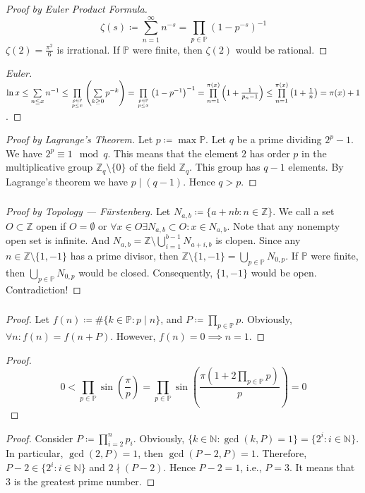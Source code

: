 \documentclass[UTF8,11pt,colorlinks,compress,openany]{beamer}%
\begin{document}
\begin{frame}\frametitle{}
\begin{proof}[Proof by Euler Product Formula]
\[\zeta(s)\coloneqq \sum\limits_{n=1}^\infty n^{-s}=\prod\limits_{p\in\mathbb{P}}\left(1-p^{-s}\right)^{-1}\]
$\zeta(2)=\frac{\pi^2}{6}$ is irrational. If $\mathbb{P}$ were finite, then $\zeta(2)$ would be rational.
\end{proof}
\begin{proof}[Euler]
$\ln x\leq\sum\limits_{n\leq x} n^{-1}\leq \prod\limits_{p\in\mathbb{P}\atop{p\leq x}}\left(\sum\limits_{k\geq 0}p^{-k}\right)=\prod\limits_{p\in\mathbb{P}\atop{p\leq x}}\left(1-p^{-1}\right)^{-1}=\prod\limits_{n=1}^{\pi(x)}\left(1+\frac{1}{p_n-1}\right)\leq \prod\limits_{n=1}^{\pi(x)}\left(1+\frac{1}{n}\right)=\pi(x)+1$.
\end{proof}
\begin{proof}[Proof by Lagrange's Theorem]
Let $p\coloneqq \max\mathbb{P}$. Let $q$ be a prime dividing $2^p-1$. We have $2^p\equiv 1 \mod q$. This means that the element $2$ has order $p$ in the multiplicative group $\mathbb{Z}_q\setminus\{0\}$ of the field $\mathbb{Z}_q$. This group has $q-1$ elements. By Lagrange's theorem we have $p\mid(q-1)$. Hence $q>p$.
\end{proof}
\end{frame}

\begin{frame}\frametitle{}
\begin{proof}[Proof by Topology --- F\"urstenberg]
Let $N_{a,b}\coloneqq \{a+nb: n\in\mathbb{Z}\}$. We call a set $O\subset\mathbb{Z}$ open if $O=\emptyset$ or $\forall x\in O\exists N_{a,b}\subset O: x \in N_{a,b}$. Note that any nonempty open set is infinite. And $N_{a,b}=\mathbb{Z}\setminus\bigcup_{i=1}^{b-1}N_{a+i,b}$ is clopen. Since any $n\in\mathbb{Z}\setminus\{1,-1\}$ has a prime divisor, then $\mathbb{Z}\setminus\{1,-1\}=\bigcup_{p \in\mathbb{P}}N_{0,p}$. If $\mathbb{P}$ were finite, then $\bigcup_{p \in\mathbb{P}}N_{0,p}$ would be closed. Consequently, $\{1,-1\}$ would be open. Contradiction!
\end{proof}
\end{frame}

\begin{frame}\frametitle{}
\begin{proof}
Let $f(n)\coloneqq \#\{k\in\mathbb{P}: p\mid n\}$, and $P\coloneqq \prod\limits_{p\in\mathbb{P}} p$. Obviously, $\forall n: f(n)=f(n+P)$. However, $f(n)=0\implies n=1$.
\end{proof}
\begin{proof}
\[0<\prod\limits_{p\in\mathbb{P}}\sin\left(\frac{\pi}{p}\right)=\prod\limits_{p\in\mathbb{P}}\sin\left(\frac{\pi\left(1+2\prod\limits_{p\in\mathbb{P}}p\right)}{p}\right)=0\]
\end{proof}
\begin{proof}
Consider $P\coloneqq \prod\limits_{i=2}^n p_i$. Obviously, $\{k\in\mathbb{N}: \gcd(k,P)=1\}=\{2^i: i\in\mathbb{N}\}$. In particular, $\gcd(2,P)=1$, then $\gcd(P-2,P)=1$. Therefore, $P-2\in\{2^i: i\in\mathbb{N}\}$ and $2\nmid(P-2)$. Hence $P-2=1$, i.e., $P=3$. It means that $3$ is the greatest prime number.
\end{proof}
\end{frame}
\end{document}
